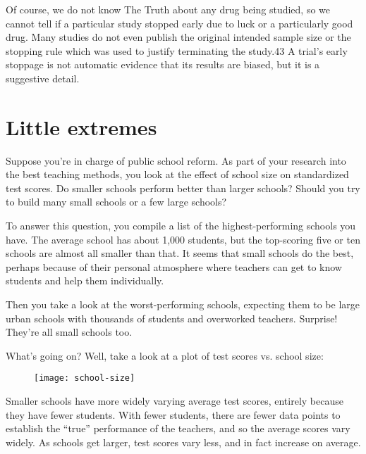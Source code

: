 Of course, we do not know The Truth about any drug being studied, so we cannot tell if a particular study stopped early due to luck or a particularly good drug. Many studies do not even publish the original intended sample size or the stopping rule which was used to justify terminating the study.43 A trial’s early stoppage is not automatic evidence that its results are biased, but it is a suggestive detail.

\section{Little extremes}
\label{chp7:littleextremes}

Suppose you’re in charge of public school reform. As part of your research into the best teaching methods, you look at the effect of school size on standardized test scores. Do smaller schools perform better than larger schools? Should you try to build many small schools or a few large schools?

To answer this question, you compile a list of the highest-performing schools you have. The average school has about 1,000 students, but the top-scoring five or ten schools are almost all smaller than that. It seems that small schools do the best, perhaps because of their personal atmosphere where teachers can get to know students and help them individually.

Then you take a look at the worst-performing schools, expecting them to be large urban schools with thousands of students and overworked teachers. Surprise! They’re all small schools too.

What’s going on? Well, take a look at a plot of test scores vs. school size:


\newpage %

\begin{figure}[h!]
    \centering
    \texttt{[image: school-size]}
    \label{fig9:school-size}
\end{figure}

Smaller schools have more widely varying average test scores, entirely because they have fewer students. With fewer students, there are fewer data points to establish the “true” performance of the teachers, and so the average scores vary widely. As schools get larger, test scores vary less, and in fact increase on average.

